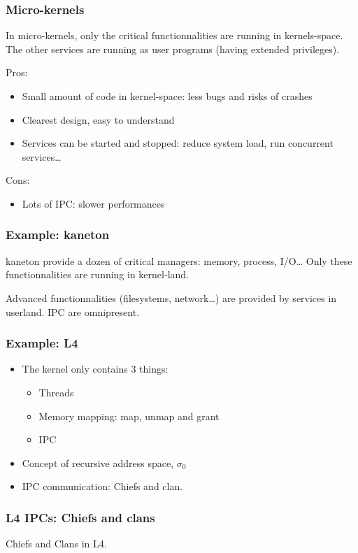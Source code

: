 \begin{frame}
  \frametitle{Micro-kernels}

  In micro-kernels, only the critical functionnalities are running in
  kernels-space. The other services are running as user programs
  (having extended privileges).

  \-

  Pros:

  \begin{itemize}
  \item
    Small amount of code in kernel-space: less bugs and risks of
    crashes
  \item
    Clearest design, easy to understand
  \item
    Services can be started and stopped: reduce system load, run
    concurrent services\ldots
  \end{itemize}

  \-

  Cons:

  \begin{itemize}
  \item
    Lots of IPC: slower performances
  \end{itemize}

\end{frame}

%
%

\begin{frame}
  \frametitle{Example: kaneton}

  kaneton provide a dozen of critical managers: memory, process,
  I/O\ldots{} Only these functionnalities are running in kernel-land.

  \begin{center}
  \end{center}

  Advanced functionnalities (filesystems, network\ldots) are provided
  by services in userland. IPC are omnipresent.

\end{frame}

\begin{frame}
  \frametitle{Example: L4}
  \begin{itemize}
        \item The kernel only contains 3 things:
        \begin{itemize}
                \item Threads
                \item Memory mapping: map, unmap and grant
                \item IPC
        \end{itemize}
        \item Concept of recursive address space, $\sigma{}_0$ 
        \item IPC communication: Chiefs and clan.
  \end{itemize}
\end{frame}
\begin{frame}
  \frametitle{L4 IPCs: Chiefs and clans}
  \begin{center}
  Chiefs and Clans in L4. 
  \end{center}
\end{frame}

